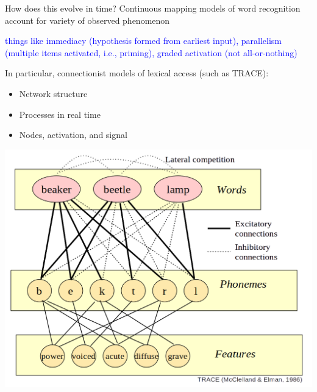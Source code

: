 \documentclass{beamer}
\newcommand{\vp}{\vspace{2mm}}
\providecommand{\cn}[1]{\textcolor{blue}{#1}}
\begin{document}
\begin{frame}{How does this evolve in time?} \large
Continuous mapping models of word recognition account for variety of observed phenomenon  \vp

\cn{things like immediacy (hypothesis formed from earliest input), parallelism (multiple items activated, i.e., priming), graded activation (not all-or-nothing)} \vp

In particular, connectionist models of lexical access (such as TRACE):
\begin{itemize}
\item Network structure
\item Processes in real time
\item Nodes, activation, and signal
\end{itemize}
\end{frame}



\begin{frame}
\begin{center}
\includegraphics[scale=0.4]{img/trace_competition.png}
\end{center}
\end{frame}
\end{document}
